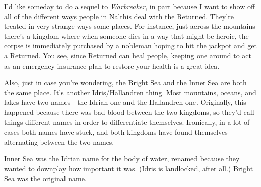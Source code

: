 I’d like someday to do a sequel to \textit{Warbreaker}, in part because I want to show off all of the different ways people in Nalthis deal with the Returned. They’re treated in very strange ways some places. For instance, just across the mountains there’s a kingdom where when someone dies in a way that might be heroic, the corpse is immediately purchased by a nobleman hoping to hit the jackpot and get a Returned. You see, since Returned can heal people, keeping one around to act as an emergency insurance plan to restore your health is a great idea.

Also, just in case you’re wondering, the Bright Sea and the Inner Sea are both the same place. It’s another Idris/Hallandren thing. Most mountains, oceans, and lakes have two names—the Idrian one and the Hallandren one. Originally, this happened because there was bad blood between the two kingdoms, so they’d call things different names in order to differentiate themselves. Ironically, in a lot of cases both names have stuck, and both kingdoms have found themselves alternating between the two names.

Inner Sea was the Idrian name for the body of water, renamed because they wanted to downplay how important it was. (Idris is landlocked, after all.) Bright Sea was the original name.



